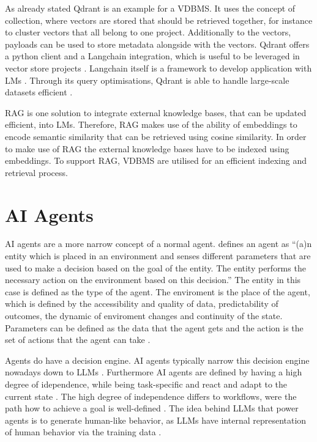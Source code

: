 \documentclass[a4paper,oneside,bibliography=totoc]{scrbook}
\begin{document}
As already stated Qdrant is an example for a \ac{VDBMS}. It uses the concept of collection, where vectors are stored that should be retrieved together, for instance to cluster vectors that all belong to one project. Additionally to the vectors, payloads can be used to store metadata alongside with the vectors. Qdrant offers a python client and a Langchain integration, which is useful to be leveraged in vector store projects \cite{Qdrant2025}. Langchain itself is a framework to develop application with \acp{LM} \cite{LangChain2025d}. Through its query optimisations, Qdrant is able to handle large-scale datasets efficient \cite{Qdrant2025,Pan2024}.

\ac{RAG} is one solution to integrate external knowledge bases, that can be updated efficient, into \acp{LM}. Therefore, \ac{RAG} makes use of the ability of embeddings to encode semantic similarity that can be retrieved using cosine similarity. In order to make use of \ac{RAG} the external knowledge bases have to be indexed using embeddings. To support \ac{RAG}, \ac{VDBMS} are utilised for an efficient indexing and retrieval process.

\section{AI Agents}
\label{sec:ai_agents}

\ac{AI} agents are a more narrow concept of a normal agent. \citet{Dorri2018} defines an agent as \enquote{(a)n entity which is placed in an environment and senses different parameters that are used to make a decision based on the goal of the entity. The entity performs the necessary action on the environment based on this decision.} \cite[S. 28574]{Dorri2018} The entity in this case is defined as the type of the agent. The enviroment is the place of the agent, which is defined by the accessibility and quality of data, predictability of outcomes, the dynamic of enviroment changes and continuity of the state. Parameters can be defined as the data that the agent gets and the action is the set of actions that the agent can take \cite{Dorri2018}.

Agents do have a decision engine. \ac{AI} agents typically narrow this decision engine nowadays down to \acp{LLM} \cite{Sapkota2025,Park2023}. Furthermore \ac{AI} agents are defined by having a high degree of idependence, while being task-specific and react and adapt to the current state \cite{Sapkota2025,OpenAI2025}. The high degree of independence differs to workflows, were the path how to achieve a goal is well-defined \cite{Anthropic2024}. The idea behind \acp{LLM} that power agents is to generate human-like behavior, as \acp{LLM} have internal representation of human behavior via the training data \cite{Park2023}.
\end{document}
